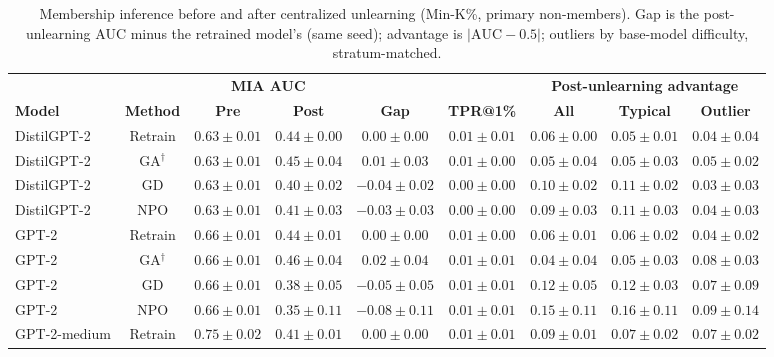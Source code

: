 \begin{table}[t]
\centering
\caption{Membership inference before and after centralized unlearning (Min-K\%, primary non-members). Gap is the post-unlearning AUC minus the retrained model's (same seed); advantage is $|\mathrm{AUC}-0.5|$; outliers by base-model difficulty, stratum-matched.}
\label{tab:central-min-k-prob-primary}
\footnotesize
\renewcommand{\arraystretch}{1.2}
\setlength{\tabcolsep}{3pt}
\begin{tabular*}{\textwidth}{@{\extracolsep{\fill}}lcccccccc@{}}
\toprule
 & & \multicolumn{2}{c}{\textbf{MIA AUC}} & & & \multicolumn{3}{c}{\textbf{Post-unlearning advantage}} \\
\cmidrule(lr){3-4}\cmidrule(lr){7-9}
\textbf{Model} & \textbf{Method} & \textbf{Pre} & \textbf{Post} & \textbf{Gap} & \textbf{TPR@1\%} & \textbf{All} & \textbf{Typical} & \textbf{Outlier} \\
\midrule
DistilGPT-2 & Retrain & $0.63 \pm 0.01$ & $0.44 \pm 0.00$ & $0.00 \pm 0.00$ & $0.01 \pm 0.01$ & $0.06 \pm 0.00$ & $0.05 \pm 0.01$ & $0.04 \pm 0.04$ \\
DistilGPT-2 & GA$^{\dagger}$ & $0.63 \pm 0.01$ & $0.45 \pm 0.04$ & $0.01 \pm 0.03$ & $0.01 \pm 0.00$ & $0.05 \pm 0.04$ & $0.05 \pm 0.03$ & $0.05 \pm 0.02$ \\
DistilGPT-2 & GD & $0.63 \pm 0.01$ & $0.40 \pm 0.02$ & $-0.04 \pm 0.02$ & $0.00 \pm 0.00$ & $0.10 \pm 0.02$ & $0.11 \pm 0.02$ & $0.03 \pm 0.03$ \\
DistilGPT-2 & NPO & $0.63 \pm 0.01$ & $0.41 \pm 0.03$ & $-0.03 \pm 0.03$ & $0.00 \pm 0.00$ & $0.09 \pm 0.03$ & $0.11 \pm 0.03$ & $0.04 \pm 0.03$ \\
GPT-2 & Retrain & $0.66 \pm 0.01$ & $0.44 \pm 0.01$ & $0.00 \pm 0.00$ & $0.01 \pm 0.00$ & $0.06 \pm 0.01$ & $0.06 \pm 0.02$ & $0.04 \pm 0.02$ \\
GPT-2 & GA$^{\dagger}$ & $0.66 \pm 0.01$ & $0.46 \pm 0.04$ & $0.02 \pm 0.04$ & $0.01 \pm 0.01$ & $0.04 \pm 0.04$ & $0.05 \pm 0.03$ & $0.08 \pm 0.03$ \\
GPT-2 & GD & $0.66 \pm 0.01$ & $0.38 \pm 0.05$ & $-0.05 \pm 0.05$ & $0.01 \pm 0.01$ & $0.12 \pm 0.05$ & $0.12 \pm 0.03$ & $0.07 \pm 0.09$ \\
GPT-2 & NPO & $0.66 \pm 0.01$ & $0.35 \pm 0.11$ & $-0.08 \pm 0.11$ & $0.01 \pm 0.01$ & $0.15 \pm 0.11$ & $0.16 \pm 0.11$ & $0.09 \pm 0.14$ \\
GPT-2-medium & Retrain & $0.75 \pm 0.02$ & $0.41 \pm 0.01$ & $0.00 \pm 0.00$ & $0.01 \pm 0.01$ & $0.09 \pm 0.01$ & $0.07 \pm 0.02$ & $0.07 \pm 0.02$ \\

\end{tabular*}
\end{table}
